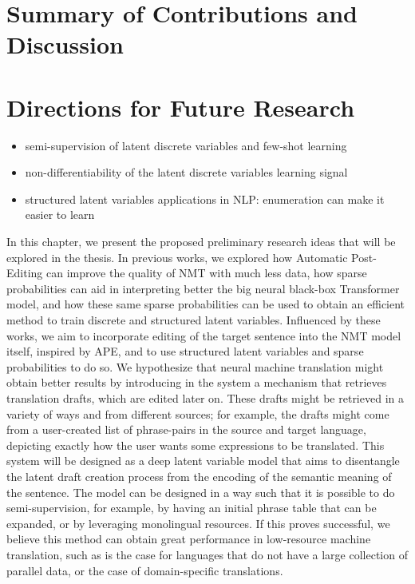 \label{cap:conclusions}

\section{Summary of Contributions and Discussion}

\section{Directions for Future Research}

\begin{itemize}
    \item semi-supervision of latent discrete variables and few-shot learning
    \item non-differentiability of the latent discrete variables learning signal
    \item structured latent variables applications in NLP: enumeration can make it easier to learn
\end{itemize}

In this chapter, we present the proposed preliminary research ideas
that will be explored in the thesis. In previous works, we explored
how Automatic Post-Editing can improve the quality of NMT with much
less data, how sparse probabilities can aid in interpreting better
the big neural black-box Transformer model, and how these same sparse
probabilities can be used to obtain an efficient method to train
discrete and structured latent variables. Influenced by these works,
we aim to incorporate editing of the target sentence into the NMT
model itself, inspired by APE, and to use structured latent variables
and sparse probabilities to do so. We hypothesize that neural machine
translation might obtain better results by introducing in the system
a mechanism that retrieves translation drafts, which
are edited later on. These drafts might be retrieved in a variety of
ways and from different sources; for example, the drafts might come
from a user-created list of phrase-pairs in the source and target
language, depicting exactly how the user wants some expressions to be
translated. This system will be designed as a deep latent variable
model that aims to disentangle the latent draft creation process from
the encoding of the semantic meaning of the sentence. The model can
be designed in a way such that it is possible to do semi-supervision,
for example, by having an initial phrase table that can be expanded,
or by leveraging monolingual resources. If this proves successful, we
believe this method can obtain great performance in low-resource
machine translation, such as is the case for languages that do not
have a large collection of parallel data, or the case of
domain-specific translations.

